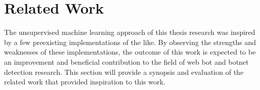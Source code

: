 
\chapter{Related Work}\label{ch:related-work}
The unsupervised machine learning approach of this thesis research was inspired by a few preexisting implementations of the like.
By observing the strengths and weaknesses of these implementations, the outcome of this work is expected to be an improvement and beneficial contribution to the field of web bot and botnet detection research.
This section will provide a synopsis and evaluation of the related work that provided inspiration to this work.






